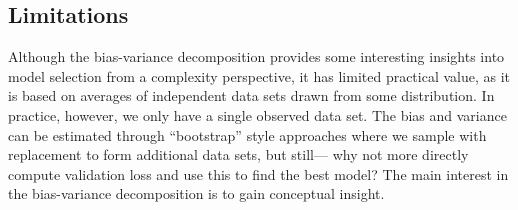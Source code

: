 \documentclass[12pt,letterpaper]{article}
\begin{document}

\subsection{Limitations}
Although the bias-variance decomposition provides some interesting insights into model selection from a complexity perspective, it has limited practical value, as it is based on averages of independent data sets drawn from some distribution. In practice, however, we only have a single observed data set.
The bias and variance can be estimated through ``bootstrap'' style
approaches where we sample with replacement to form additional 
data sets, but still--- why not more directly compute validation loss
and use this to find the best model? The main interest in the bias-variance decomposition is to gain conceptual insight. 
\end{document}

